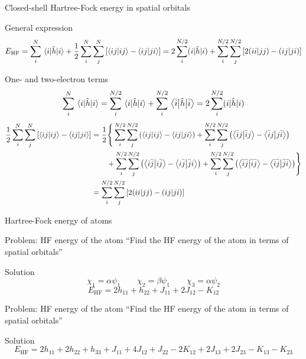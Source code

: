 \documentclass[aspectratio=169,9pt]{beamer}
\newcommand{\EHF}{E_\text{HF}}
\newcommand{\hh}{\Hat{h}}
\newcommand{\violet}[1]{\textcolor{hfViolet}{#1}}
\newcommand{\rbraket}[2]{( #1 | #2 )}
\newcommand{\rmel}[3]{( #1 | #2 | #3 )}
\begin{document}
\begin{frame}{Closed-shell Hartree-Fock energy in spatial orbitals}
	\begin{block}{General expression}
		\begin{equation*}
			\EHF 
			= \sum_i^N \mel{i}{\hh}{i} + \frac{1}{2} \sum_i^N \sum_j^N \qty[ \braket{ij}{ij} - \braket{ij}{ji} ]
			= 2 \sum_i^{N/2} \rmel{i}{\hh}{i} + \sum_i^{N/2} \sum_j^{N/2} \qty[ 2\rbraket{ii}{jj} - \rbraket{ij}{ji} ]
		\end{equation*}
	\end{block}
	\begin{block}{One- and two-electron terms}
		\small
		\begin{equation*}
			\sum_i^N \mel{i}{\hh}{i} = \sum_i^{N/2} \mel{i}{\hh}{i} + \sum_i^{N/2} \mel{\Bar{i}}{\hh}{\Bar{i}} = 2 \sum_i^{N/2} \rmel{i}{\hh}{i}
		\end{equation*}
		\begin{equation*}
		\begin{split}
			\frac{1}{2} \sum_i^N \sum_j^N \qty[ \braket{ij}{ij} - \braket{ij}{ji} ]
			& = \frac{1}{2} \Bigg\{  
				  \sum_i^{N/2} \sum_j^{N/2} \qty( \braket{ij}{ij} - \braket{ij}{ji} )
				+ \sum_i^{N/2} \sum_j^{N/2} \qty( \braket{\Bar{i}j}{\Bar{i}j} - \braket{\Bar{i}j}{j\Bar{i}} )
				\\
				& \qquad + \sum_i^{N/2}  \sum_j^{N/2} \qty( \braket{i\Bar{j}}{i\Bar{j}} - \braket{i\Bar{j}}{\Bar{j}i} )
				+ \sum_i^{N/2}  \sum_j^{N/2} \qty( \braket{\Bar{i}\Bar{j}}{\Bar{i}\Bar{j}} - \braket{\Bar{i}\Bar{j}}{\Bar{j}\Bar{i}} )
				\Bigg\}
			\\
			& = \sum_i^{N/2} \sum_j^{N/2} \qty[ 2\rbraket{ii}{jj} - \rbraket{ij}{ji} ]
		\end{split}
		\end{equation*}
	\end{block}	
\end{frame}


\begin{frame}{Hartree-Fock energy of atoms}
	\begin{block}{Problem: HF energy of the  atom}
		\violet{``Find the HF energy of the \ce{Li} atom in terms of spatial orbitals''}
	\end{block}
	\pause
	\begin{block}{Solution}
		$$ \chi_1 = \alpha \psi_1 \qquad \chi_2 = \beta \psi_1
		\qquad \chi_3 = \alpha \psi_2 $$
		\begin{equation*}
			E_\text{HF} = 2 h_{11} + h_{22} + J_{11} + 2J_{12} - K_{12}
		\end{equation*}
	\end{block}
	\pause
	\begin{block}{Problem: HF energy of the  atom}
		\violet{``Find the HF energy of the \ce{B} atom in terms of spatial orbitals''}
	\end{block}
	\pause
	\begin{block}{Solution}
		$$ E_\text{HF} = 2h_{11} + 2h_{22} + h_{33} + J_{11} + 4J_{12} + J_{22} - 2K_{12} + 2J_{13} + 2J_{23} - K_{13} - K_{23}$$
	\end{block}
\end{frame}
\end{document}
